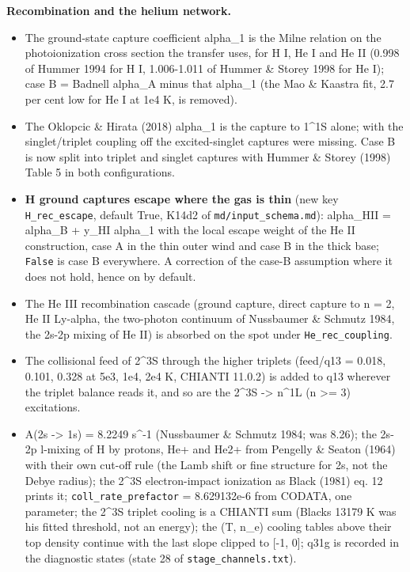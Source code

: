 \documentclass[english,a4paper]{my_memo}
\providecommand{\tightlist}{\setlength{\itemsep}{0pt}\setlength{\parskip}{0pt}}
\begin{document}
\textbf{Recombination and the helium network.}

\begin{itemize}
\tightlist
\item
  The ground-state capture coefficient alpha\_1 is the Milne relation on the
  photoionization cross section the transfer uses, for H I, He I and He II
  (0.998 of Hummer 1994 for H I, 1.006-1.011 of Hummer \& Storey 1998 for
  He I); case B = Badnell alpha\_A minus that alpha\_1 (the Mao \& Kaastra fit,
  2.7 per cent low for He I at 1e4 K, is removed).
\item
  The Oklopcic \& Hirata (2018) alpha\_1 is the capture to 1\^{}1S alone; with the
  singlet/triplet coupling off the excited-singlet captures were missing.
  Case B is now split into triplet and singlet captures with Hummer \& Storey
  (1998) Table 5 in both configurations.
\item
  \textbf{H ground captures escape where the gas is thin} (new key \texttt{H\_rec\_escape},
  default True, K14d2 of \texttt{md/input\_schema.md}): alpha\_HII = alpha\_B + y\_HI
  alpha\_1 with the local escape weight of the He II construction, case A in
  the thin outer wind and case B in the thick base; \texttt{False} is case B
  everywhere. A correction of the case-B assumption where it does not hold,
  hence on by default.
\item
  The He III recombination cascade (ground capture, direct capture to n = 2,
  He II Ly-alpha, the two-photon continuum of Nussbaumer \& Schmutz 1984, the
  2s-2p mixing of He II) is absorbed on the spot under \texttt{He\_rec\_coupling}.
\item
  The collisional feed of 2\^{}3S through the higher triplets (feed/q13 = 0.018,
  0.101, 0.328 at 5e3, 1e4, 2e4 K, CHIANTI 11.0.2) is added to q13 wherever
  the triplet balance reads it, and so are the 2\^{}3S -\textgreater{} n\^{}1L (n \textgreater= 3)
  excitations.
\item
  A(2s -\textgreater{} 1s) = 8.2249 s\^{}-1 (Nussbaumer \& Schmutz 1984; was 8.26); the 2s-2p
  l-mixing of H by protons, He+ and He2+ from Pengelly \& Seaton (1964) with
  their own cut-off rule (the Lamb shift or fine structure for 2s, not the
  Debye radius); the 2\^{}3S electron-impact ionization as Black (1981) eq. 12
  prints it; \texttt{coll\_rate\_prefactor} = 8.629132e-6 from CODATA, one parameter;
  the 2\^{}3S triplet cooling is a CHIANTI sum (Black\textquotesingle s 13179 K was his fitted
  threshold, not an energy); the (T, n\_e) cooling tables above their top
  density continue with the last slope clipped to {[}-1, 0{]}; q31g is recorded
  in the diagnostic states (state 28 of \texttt{stage\_channels.txt}).
\end{itemize}
\end{document}
